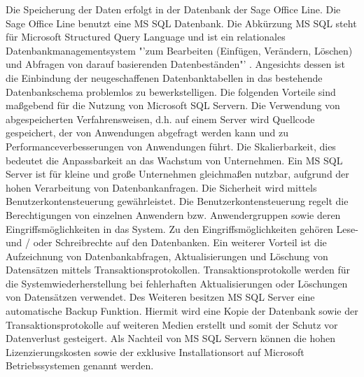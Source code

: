 Die Speicherung der Daten erfolgt in der Datenbank der Sage Office Line. Die Sage Office Line benutzt eine MS SQL Datenbank. Die Abkürzung MS SQL steht für Microsoft Structured Query Language und ist ein relationales Datenbankmanagementsystem "'zum Bearbeiten (Einfügen, Verändern, Löschen) und Abfragen von darauf basierenden Datenbeständen"' \cite{sql1} \cite{sql2}. Angesichts dessen ist die Einbindung der neugeschaffenen Datenbanktabellen in das bestehende Datenbankschema problemlos zu bewerkstelligen. Die folgenden Vorteile sind maßgebend für die Nutzung von Microsoft SQL Servern. Die Verwendung von abgespeicherten Verfahrensweisen, d.h. auf einem Server wird Quellcode  gespeichert, der von Anwendungen abgefragt werden kann und zu Performanceverbesserungen von Anwendungen führt. Die Skalierbarkeit, dies bedeutet die Anpassbarkeit an das Wachstum von Unternehmen. Ein MS SQL Server ist für kleine und große Unternehmen gleichmaßen nutzbar, aufgrund der hohen Verarbeitung von Datenbankanfragen. Die Sicherheit wird mittels Benutzerkontensteuerung gewährleistet. Die Benutzerkontensteuerung regelt die Berechtigungen von einzelnen Anwendern bzw. Anwendergruppen sowie deren Eingriffsmöglichkeiten in das System. Zu den Eingriffsmöglichkeiten gehören Lese- und / oder Schreibrechte auf den Datenbanken. Ein weiterer Vorteil ist die Aufzeichnung von Datenbankabfragen, Aktualisierungen und Löschung von Datensätzen mittels Transaktionsprotokollen. Transaktionsprotokolle werden für die Systemwiederherstellung bei fehlerhaften Aktualisierungen oder Löschungen von Datensätzen verwendet. Des Weiteren besitzen MS SQL Server eine automatische Backup Funktion. Hiermit wird eine Kopie der Datenbank sowie der Transaktionsprotokolle auf weiteren Medien erstellt und somit der Schutz vor Datenverlust gesteigert. Als Nachteil von MS SQL Servern können die hohen Lizenzierungskosten sowie der exklusive Installationsort auf Microsoft Betriebssystemen genannt werden. \cite{SQLv1}